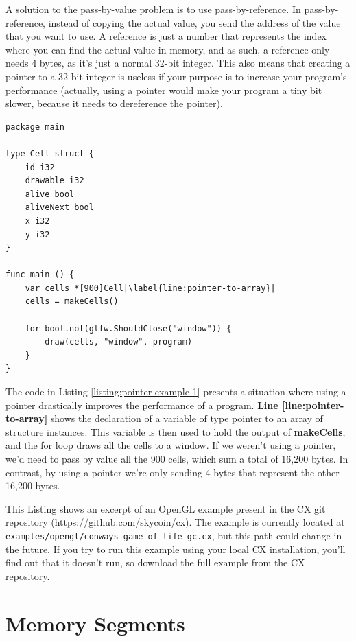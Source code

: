 \documentclass[11pt,fleqn,openany]{book} %
\begin{document}
A solution to the pass-by-value problem is to use pass-by-reference. In pass-by-reference, instead of copying the actual value, you send the address of the value that you want to use. A reference is just a number that represents the index where you can find the actual value in memory, and as such, a reference only needs 4 bytes, as it's just a normal 32-bit integer. This also means that creating a pointer to a 32-bit integer is useless if your purpose is to increase your program's performance (actually, using a pointer would make your program a tiny bit slower, because it needs to dereference the pointer).


\begin{lstlisting}[caption={Pointer to a Structure Instance},captionpos=b,label={listing:pointer-example-1}]
package main

type Cell struct {
	id i32
	drawable i32
	alive bool
	aliveNext bool
	x i32
	y i32
}

func main () {
	var cells *[900]Cell|\label{line:pointer-to-array}|
	cells = makeCells()
    
    for bool.not(glfw.ShouldClose("window")) {
        draw(cells, "window", program)
    }
}
\end{lstlisting}

The code in Listing \ref{listing:pointer-example-1} presents a situation where using a pointer drastically improves the performance of a program. \textbf{Line \ref{line:pointer-to-array}} shows the declaration of a variable of type pointer to an array of structure instances. This variable is then used to hold the output of \textbf{makeCells}, and the for loop draws all the cells to a window. If we weren't using a pointer, we'd need to pass by value all the 900 cells, which sum a total of 16,200 bytes. In contrast, by using a pointer we're only sending 4 bytes that represent the other 16,200 bytes.

This Listing shows an excerpt of an OpenGL example present in the CX git repository (https://github.com/skycoin/cx). The example is currently located at \lstinline{examples/opengl/conways-game-of-life-gc.cx}, but this path could change in the future. If you try to run this example using your local CX installation, you'll find out that it doesn't run, so download the full example from the CX repository.

\section{Memory Segments}
\label{section:memory-segments}
\end{document}
